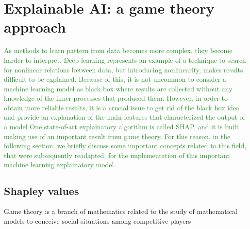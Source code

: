 \documentclass[11pt]{report}
\begin{document}
\chapter{Explainable AI: a game theory approach}\label{chap:shapley_values}
\textcolor{ForestGreen}{
As methods to learn pattern from data becomes more complex, they become harder to interpret.
Deep learning represents an example of a technique to search for nonlinear relations between data, but introducing nonlinearity, makes results difficult to be explained.
Because of this, it is not uncommon to consider a machine learning model as black box where results are collected without any knowledge of the inner processes that produced them.
However, in order to obtain more reliable results, it is a crucial issue to get rid of the black box idea and provide an explanation of the main features that characterized the output of a model
One state-of-art explainatory algorithm is called SHAP, and it is built making use of an important result from game theory.
For this reason, in the following section, we briefly discuss some important concepts related to this field, that were subsequently readapted, for the implementation of this important machine learning explainatory model.
}

\section{Shapley values}

Game theory is a branch of mathematics related to the study of mathematical models to  conceive social situations among competitive players \cite{ross-2021}
\end{document}

